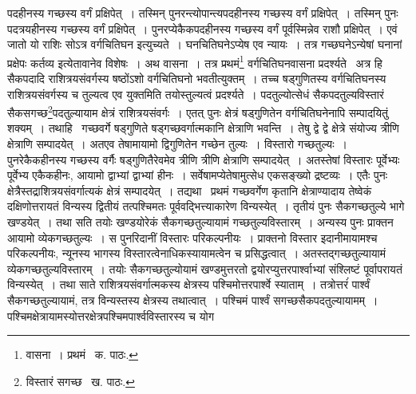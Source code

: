 \documentclass[11pt, openany]{book}
\begin{document}
\noindent पदहीनस्य गच्छस्य वर्गं प्रक्षिपेत्~। तस्मिन् पुनरन्त्योपान्त्यपदहीनस्य गच्छस्य वर्गं प्रक्षिपेत्~। तस्मिन् पुनः पदत्रयहीनस्य गच्छस्य वर्गं प्रक्षिपेत्~। पुनरप्येकैकपदहीनस्य गच्छस्य वर्गं पूर्वस्मिन्नेव राशौ प्रक्षिपेत्~। एवं जातो यो राशिः सोऽत्र वर्गचितिघन इत्युच्यते~। घनचितिघनेऽप्येष एव न्यायः~। तत्र गच्छघनेऽन्येषां घनानां प्रक्षेपः कर्तव्य इत्येतावानेव विशेषः~। अथ वासना~। तत्र प्रथमं\renewcommand{\thefootnote}{१}\footnote{वासना~। प्रथमं \textendash\ क. पाठः.} वर्गचितिघनवासना प्रदर्श्यते \textendash\ अत्र हि सैकपदादि राशित्रयसंवर्गस्य षष्ठोंऽशो वर्गचितिघनो भवतीत्युक्तम्~। तच्च षड्गुणितस्य वर्गचितिघनस्य राशित्रयसंवर्गस्य च तुल्यत्व एव युक्तमिति तयोस्तुल्यत्वं प्रदर्श्यते~। पदतुल्योत्सेधं सैकपदतुल्यविस्तारं सैकसगच्छ\renewcommand{\thefootnote}{२}\footnote{विस्तारं सगच्छ \textendash\ ख. पाठः.}पदतुल्यायाम क्षेत्रं राशित्रयसंवर्गः~। एतत् पुनः क्षेत्रं षड्गुणितेन वर्गचितिघनेनापि सम्पादयितुं शक्यम्~। तथाहि \textendash\ गच्छवर्गे षड्गुणिते षड्गच्छवर्गात्मकानि क्षेत्राणि भवन्ति~। तेषु द्वे द्वे क्षेत्रे संयोज्य त्रीणि क्षेत्राणि सम्पादयेत्~। अतएव तेषामायामो द्विगुणितेन गच्छेन तुल्यः~। विस्तारो गच्छतुल्यः~। पुनरेकैकहीनस्य गच्छस्य वर्गैः षड्गुणितैरेवमेव त्रीणि त्रीणि क्षेत्राणि सम्पादयेत्~। अतस्तेषां विस्तारः पूर्वेभ्यः पूर्वेभ्य एकैकहीनः, आयामो द्वाभ्यां द्वाभ्यां हीनः~। सर्वेषामप्येतेषामुत्सेध एकसङ्ख्यो द्रष्टव्यः~। एतैः पुनः क्षेत्रैस्तद्राशित्रयसंवर्गात्यकं क्षेत्रं सम्पादयेत्~। तद्यथा \textendash\ प्रथमं गच्छवर्गेण कृतानि क्षेत्राण्यादाय तेष्वेकं दक्षिणोत्तरायतं विन्यस्य द्वितीयं तत्पश्चिमतः पूर्ववद्भित्त्याकारेण विन्यस्येत्~। तृतीयं पुनः सैकगच्छतुल्ये भागे खण्डयेत्~। तथा सति तयोः खण्डयोरेकं सैकगच्छतुल्यायामं गच्छतुल्यविस्तारम्~। अन्यस्य पुनः प्राक्तन आयामो व्येकगच्छतुल्यः~। स पुनरिदानीं विस्तारः परिकल्पनीयः~। प्राक्तनो विस्तार इदानीमायामश्च परिकल्पनीयः, न्यूनस्य भागस्य विस्तारत्वेनाधिकस्यायामत्वेन च प्रसिद्धत्वात्~। अतस्तद्गच्छतुल्यायामं व्येकगच्छतुल्यविस्तारम्~। तयोः सैकगच्छतुल्योयामं खण्डमुत्तरतो द्वयोरप्युत्तरपार्श्वाभ्यां संश्लिष्टं पूर्वापरायतं विन्यस्येत्~। तथा साते राशित्रयसंवर्गात्मकस्य क्षेत्रस्य पश्चिमोत्तरपार्श्वे स्याताम्~। तत्रोत्तरंं पार्श्वं सैकगच्छतुल्यायामं, तत्र विन्यस्तस्य क्षेत्रस्य तथात्वात्~। पश्चिमं पार्श्वं सगच्छसैकपदतुल्यायामम्~। पश्चिमक्षेत्रायामस्योत्तरक्षेत्रपश्चिमपार्श्वविस्तारस्य च योग

\newpage
\end{document}
